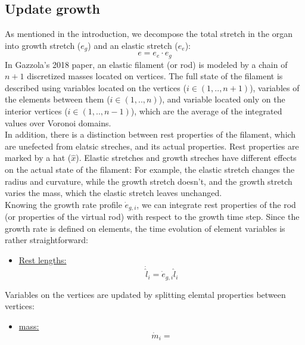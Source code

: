 \documentclass[a4paper, 11pt]{article}
\begin{document}
\subsection*{Update growth}
As mentioned in the introduction, we decompose the total stretch in the organ into growth stretch ($e_g$) and an elastic stretch ($e_e$):
\begin{equation}
    e=e_e\cdot e_g
\end{equation}
In Gazzola's 2018 paper, an elastic filament (or rod) is modeled by a chain of $n+1$ discretized masses located on vertices. The full state of the filament is described using variables located on the vertices ($i\in(1,..,n+1)$), variables of the elements between them ($i\in(1,..,n)$), and variable located only on the interior vertices ($i\in(1,..,n-1)$), which are the average of the integrated values over Voronoi domains.
\\
In addition, there is a distinction between rest properties of the filament, which are unefected from elatsic streches, and its actual properties. Rest properties are marked by a hat ($\hat{x}$). Elastic stretches and growth streches have different effects on the actual state of the filament: For example, the elastic stretch changes the radius and curvature, while the growth stretch doesn't, and the growth stretch varies the mass, which the elastic stretch leaves unchanged.\\ Knowing the growth rate profile $\dot{e}_{g,i}$, we can integrate rest properties of the rod (or properties of the virtual rod) with respect to the growth time step. Since the growth rate is defined on elements, the time evolution of element variables is rather straightforward:
\begin{itemize}
    \item \underline{Rest lengths:}
    \begin{equation}
        \dot{\hat{l}}_i=\dot{e}_{g,i}\hat{l}_i
    \end{equation}
\end{itemize}
Variables on the vertices are updated by splitting elemtal properties between vertices:
\begin{itemize}
    \item \underline{mass:}
    \begin{equation}
        \dot{m}_i=
    \end{equation}
\end{itemize}
\end{document}
